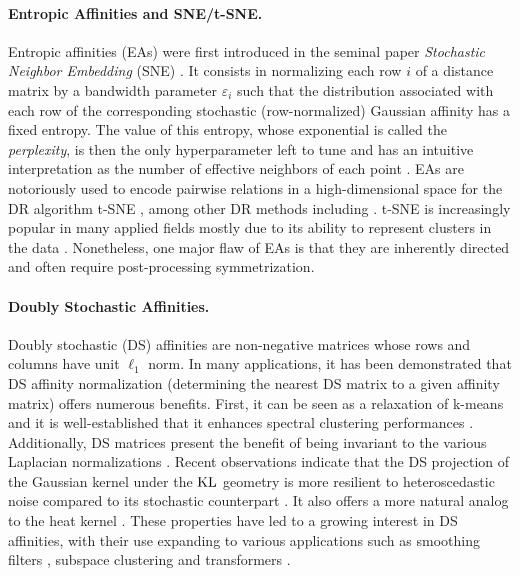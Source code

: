 \paragraph{Entropic Affinities and SNE/t-SNE.}
Entropic affinities (EAs) were first introduced in the
seminal paper \emph{Stochastic Neighbor Embedding} (SNE) 
\cite{hinton2002stochastic}. It consists in normalizing each row $i$ of a distance matrix by a
bandwidth parameter $\varepsilon_i$ such that the distribution associated with each row of the corresponding stochastic (\ie row-normalized) Gaussian affinity has a fixed entropy. The value of this entropy, whose exponential is called
the \emph{perplexity}, is then the only hyperparameter left to tune and has
an intuitive interpretation as the number of effective neighbors of each point \cite{vladymyrov2013entropic}.
EAs are notoriously used to encode pairwise relations in a high-dimensional space for the DR algorithm t-SNE \cite{van2008visualizing}, among other DR methods including \cite{carreira2010elastic}. t-SNE is increasingly popular in many applied fields \cite{kobak2019art,
melit2020unsupervised} mostly due to its ability to represent clusters in the data \cite{linderman2019clustering, JMLR:v23:21-0524}. Nonetheless, one major flaw of EAs is that they are inherently directed and often require post-processing symmetrization.

\paragraph{Doubly Stochastic Affinities.}
Doubly stochastic (DS) affinities are non-negative matrices whose rows and columns have unit $\ell_1$ norm.
In many applications, it has been demonstrated that DS affinity normalization (\ie determining the nearest DS matrix to a given affinity matrix) offers numerous benefits. First, it can be seen as a relaxation of k-means \cite{zass2005unifying} and it is well-established that it enhances spectral clustering performances \cite{Ding_understand,Zass,beauchemin2015affinity}. Additionally, DS matrices present the benefit of being invariant to the various Laplacian normalizations \cite{von2007tutorial}. Recent observations indicate that the DS projection of the Gaussian kernel under the $\operatorname{KL}$ geometry is more resilient to heteroscedastic noise compared to its stochastic counterpart \cite{landa2021doubly}. It also offers a more natural analog to the heat kernel \cite{marshall2019manifold}.
These properties have led to a growing interest in DS affinities, with their use expanding to various applications such as smoothing filters \cite{Milanfar}, subspace clustering \cite{lim2020doubly} and transformers \cite{sander2022sinkformers}.

